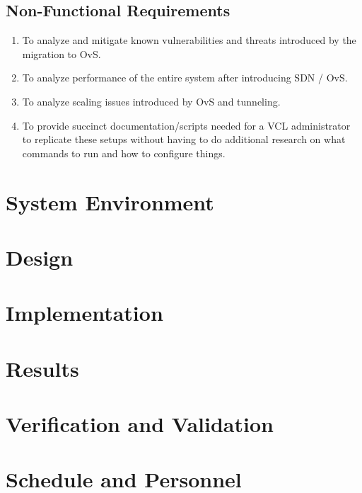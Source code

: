 \documentclass{article}
\begin{document}
\subsection{Non-Functional Requirements}
    \begin{enumerate}
        \item To analyze and mitigate known vulnerabilities and threats introduced by the migration to OvS.
        \item To analyze performance of the entire system after introducing SDN / OvS.
        \item To analyze scaling issues introduced by OvS and tunneling.
        \item To provide succinct documentation/scripts needed for a VCL administrator to replicate these setups without having to do additional research on what commands to run and how to configure things. 
    
    \end{enumerate}
    
\section{System Environment}
\section{Design}
\section{Implementation}
\section{Results}
\section{Verification and Validation}
\section{Schedule and Personnel}
\end{document}
